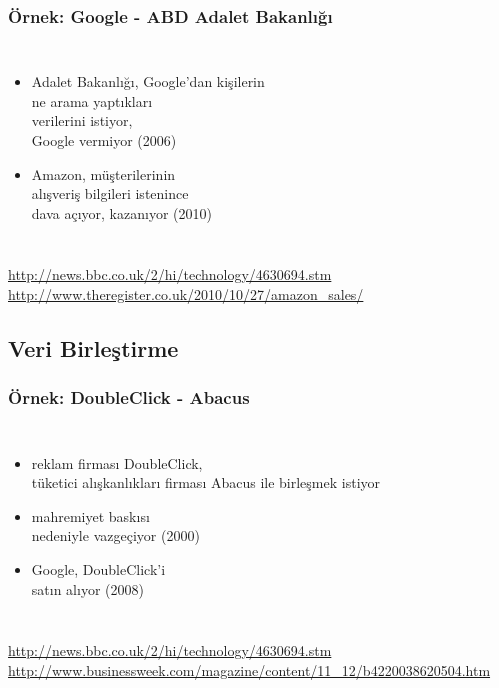 \documentclass[dvipsnames]{beamer}
\theoremstyle{definition}
\theoremstyle{example}
\theoremstyle{plain}
\begin{document}
\begin{frame}
  \frametitle{Örnek: Google - ABD Adalet Bakanlığı}

  \begin{columns}

    \begin{itemize}
      \item Adalet Bakanlığı, Google'dan kişilerin\\
        ne arama yaptıkları\\
        verilerini istiyor,\\
        Google vermiyor (2006)

      \pause
      \item Amazon, müşterilerinin\\
        alışveriş bilgileri istenince\\
        dava açıyor, kazanıyor (2010)
    \end{itemize}
  \end{columns}

  \medskip
  \tiny{\url{http://news.bbc.co.uk/2/hi/technology/4630694.stm}}\\
  \tiny{\url{http://www.theregister.co.uk/2010/10/27/amazon_sales/}}\\
\end{frame}

\subsection{Veri Birleştirme}

\begin{frame}
  \frametitle{Örnek: DoubleClick - Abacus}

  \begin{columns}

    \begin{itemize}
      \item reklam firması DoubleClick,\\
        tüketici alışkanlıkları firması Abacus
        ile birleşmek istiyor\\
      \item mahremiyet baskısı\\
        nedeniyle vazgeçiyor (2000)

      \pause
      \medskip
      \item Google, DoubleClick'i\\
        satın alıyor (2008)
    \end{itemize}
  \end{columns}

  \medskip
  \tiny{\url{http://news.bbc.co.uk/2/hi/technology/4630694.stm}}\\
  \tiny{\url{http://www.businessweek.com/magazine/content/11_12/b4220038620504.htm}}\\
\end{frame}
\end{document}
